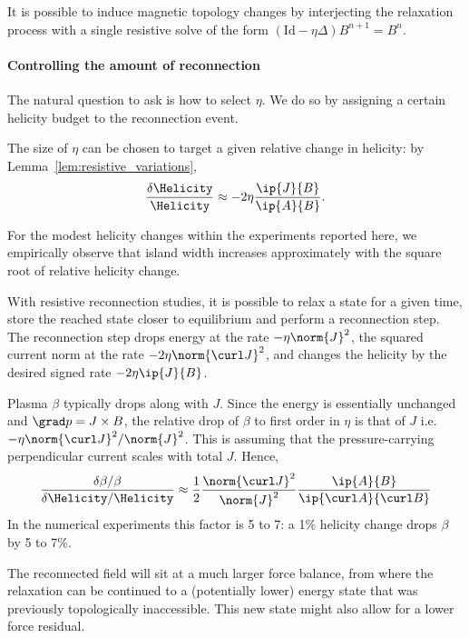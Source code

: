\documentclass[%
 reprint,
 superscriptaddress,
 amsmath,amssymb,
 aps, nofootinbib, floatfix]{revtex4-2}
\begin{document}
It is possible to induce magnetic topology changes by interjecting the relaxation process with a single resistive solve of the form $(\mathrm{Id} - \eta \Delta) B^{n+1} = B^n$. 

\paragraph{Controlling the amount of reconnection}
The natural question to ask is how to select $\eta$. We do so by assigning a certain helicity budget to the reconnection event.
\begin{corollary}
    \label{cor:resistive_dose}
    The size of $\eta$ can be chosen to target a given relative change in helicity: by Lemma~\ref{lem:resistive_variations},
\begin{align}
    \label{eq:helicity_drop}
    \frac{\delta \Helicity}{\Helicity} \approx -2 \eta \frac{\ip{J}{B}}{\ip{A}{B}} .
\end{align}
\end{corollary}

For the modest helicity changes within the experiments reported here, we empirically observe that island width increases approximately with the square root of relative helicity change.

With resistive reconnection studies, it is possible to relax a state for a given time, store the reached state closer to equilibrium and perform a reconnection step. The reconnection step drops energy at the rate $-\eta \norm{J}^2$, the squared current norm at the rate $-2 \eta \norm{\curl J}^2 $, and changes the helicity by the desired signed rate $-2\eta \ip{J}{B}$.    

Plasma $\beta$ typically drops along with $J$. Since the energy is essentially unchanged and $\grad p = J \times B$, the relative drop of $\beta$ to first order in $\eta$ is that of $J$ i.e. $-\eta {\norm{\curl J}^2 } / {\norm{J}^2 }$. This is assuming that the pressure-carrying perpendicular current scales with total $J$. Hence,
\begin{align}
    \frac {\delta \beta / \beta}{\delta \Helicity / \Helicity} \approx \frac 1 2 \frac{\norm{\curl J}^2 }{\norm{J}^2 } 
    \frac{\ip{A}{B}}{\ip{\curl A}{\curl B}}   
\end{align}
In the numerical experiments this factor is 5 to 7: a 1\% helicity change drops $\beta$ by 5 to 7\%.

The reconnected field will sit at a much larger force balance, from where the relaxation can be continued to a (potentially lower) energy state that was previously topologically inaccessible. This new state might also allow for a lower force residual.
\end{document}

